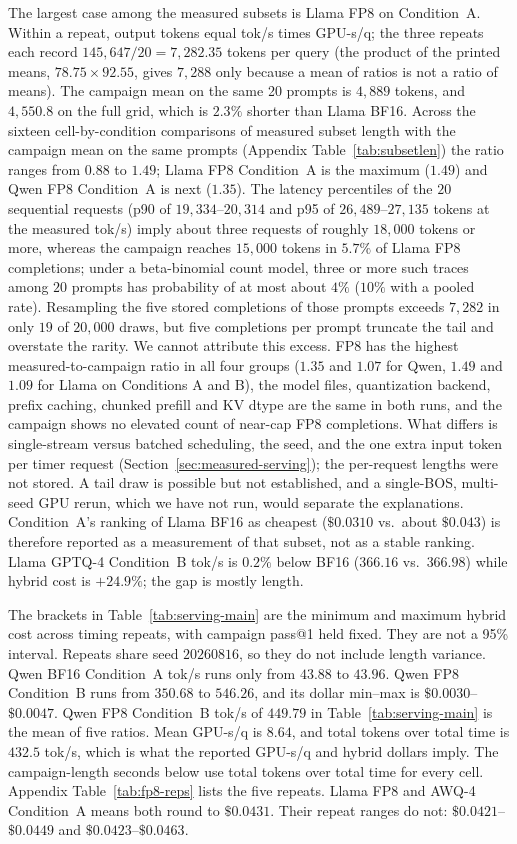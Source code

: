 \documentclass[11pt,a4paper]{article}
\begin{document}
The largest case among the measured subsets is Llama FP8 on Condition~A. Within a repeat, output tokens equal tok/s times GPU-s/q; the three repeats each record $145{,}647/20=7{,}282.35$ tokens per query (the product of the printed means, $78.75\times 92.55$, gives $7{,}288$ only because a mean of ratios is not a ratio of means). The campaign mean on the same 20 prompts is $4{,}889$ tokens, and $4{,}550.8$ on the full grid, which is $2.3\%$ shorter than Llama BF16. Across the sixteen cell-by-condition comparisons of measured subset length with the campaign mean on the same prompts (Appendix Table~\ref{tab:subsetlen}) the ratio ranges from $0.88$ to $1.49$; Llama FP8 Condition~A is the maximum ($1.49$) and Qwen FP8 Condition~A is next ($1.35$). The latency percentiles of the $20$ sequential requests (p90 of $19{,}334$--$20{,}314$ and p95 of $26{,}489$--$27{,}135$ tokens at the measured tok/s) imply about three requests of roughly $18{,}000$ tokens or more, whereas the campaign reaches $15{,}000$ tokens in $5.7\%$ of Llama FP8 completions; under a beta-binomial count model, three or more such traces among $20$ prompts has probability of at most about $4\%$ ($10\%$ with a pooled rate). Resampling the five stored completions of those prompts exceeds $7{,}282$ in only $19$ of $20{,}000$ draws, but five completions per prompt truncate the tail and overstate the rarity. We cannot attribute this excess. FP8 has the highest measured-to-campaign ratio in all four groups ($1.35$ and $1.07$ for Qwen, $1.49$ and $1.09$ for Llama on Conditions A and B), the model files, quantization backend, prefix caching, chunked prefill and KV dtype are the same in both runs, and the campaign shows no elevated count of near-cap FP8 completions. What differs is single-stream versus batched scheduling, the seed, and the one extra input token per timer request (Section~\ref{sec:measured-serving}); the per-request lengths were not stored. A tail draw is possible but not established, and a single-BOS, multi-seed GPU rerun, which we have not run, would separate the explanations. Condition~A's ranking of Llama BF16 as cheapest ($\$0.0310$ vs.\ about $\$0.043$) is therefore reported as a measurement of that subset, not as a stable ranking. Llama GPTQ-4 Condition~B tok/s is $0.2\%$ below BF16 ($366.16$ vs.\ $366.98$) while hybrid cost is $+24.9\%$; the gap is mostly length.

The brackets in Table~\ref{tab:serving-main} are the minimum and maximum hybrid cost across timing repeats, with campaign pass@1 held fixed. They are not a 95\% interval. Repeats share seed $20260816$, so they do not include length variance. Qwen BF16 Condition~A tok/s runs only from $43.88$ to $43.96$. Qwen FP8 Condition~B runs from $350.68$ to $546.26$, and its dollar min--max is $\$0.0030$--$\$0.0047$. Qwen FP8 Condition~B tok/s of $449.79$ in Table~\ref{tab:serving-main} is the mean of five ratios. Mean GPU-s/q is $8.64$, and total tokens over total time is $432.5$ tok/s, which is what the reported GPU-s/q and hybrid dollars imply. The campaign-length seconds below use total tokens over total time for every cell. Appendix Table~\ref{tab:fp8-reps} lists the five repeats. Llama FP8 and AWQ-4 Condition~A means both round to $\$0.0431$. Their repeat ranges do not: $\$0.0421$--$\$0.0449$ and $\$0.0423$--$\$0.0463$.
\end{document}
